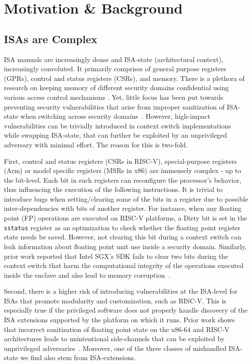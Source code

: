 \section{Motivation \& Background}
\label{sec:motivation}
\subsection{ISAs are Complex}




ISA manuals are increasingly dense and ISA-state (architectural context), increasingly convoluted. 
It primarily comprises of general purpose registers (GPRs), control and status registers (CSRs), and memory. 
There is a plethora of research on keeping memory of different security domains confidential using various access control mechanisms \cite{vtx, riscv-isa, arm-mpu, sgx, trustzone}.
Yet, little focus has been put towards preventing security vulnerabilities that arise from improper sanitization of ISA-state when switching across security domains~\cite{totw}.  
However, high-impact vulnerabilities can be trivially introduced in context switch implementations while swapping ISA-state, that can further be exploited by an unprivileged adversary with minimal effort. 
The reason for this is two-fold.

First, control and status registers (CSRs in RISC-V), special-purpose registers (Arm) or model specific registers (MSRs in x86) are immensely complex - up to the bit-level. 
Each bit in such registers can reconfigure the processor's behavior, thus influencing the execution of the following instructions.
It is trivial to introduce bugs when setting/clearing some of the bits in a register due to possible inter-dependencies with bits of another register. 
For instance, when any floating point (FP) operations are executed on RISC-V platforms, a Dirty bit is set in the \texttt{sstatus} register as an optimization to check whether the floating point register state needs be saved. 
However, not clearing this bit during a context switch can leak information about floating point unit use inside a security domain. 
Similarly, prior work reported that Intel SGX's SDK fails to clear two bits during the context switch that harm the computational integrity of the operations executed inside the enclave and also lead to memory corruption~\cite{totw}. 

Second, there is a higher risk of introducing vulnerabilities at the ISA-level for ISAs that promote modularity and customization, such as RISC-V.
This is especially true if the privileged software does not properly handle discovery of the ISA extensions supported by the platform on which it runs. 
Prior work shows that incorrect sanitization of floating point state on the x86-64 and RISC-V architectures leads to unintentional side-channels that can be exploited by unprivileged adversaries~\cite{dtrap-fpu}. 
Moreover, one of the three classes of mishandled ISA-state we find also stem from ISA-extensions. 

